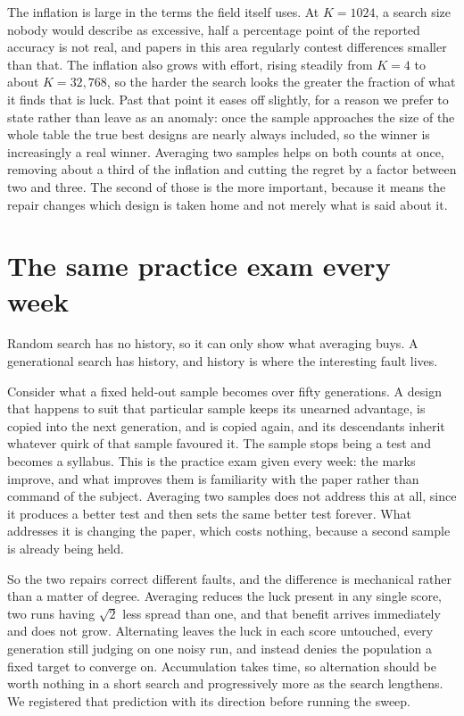 \documentclass[11pt]{article}
\begin{document}
The inflation is large in the terms the field itself uses. At $K = 1024$, a search size nobody would
describe as excessive, half a percentage point of the reported accuracy is not real, and papers in this
area regularly contest differences smaller than that. The inflation also grows with effort, rising
steadily from $K = 4$ to about $K = 32{,}768$, so the harder the search looks the greater the fraction
of what it finds that is luck. Past that point it eases off slightly, for a reason we prefer to state
rather than leave as an anomaly: once the sample approaches the size of the whole table the true best
designs are nearly always included, so the winner is increasingly a real winner. Averaging two
samples helps on both counts at once, removing about a third of the inflation and cutting the regret by
a factor between two and three. The second of those is the more important, because it means the repair
changes which design is taken home and not merely what is said about it.

\section{The same practice exam every week}\label{sec:repairs}

Random search has no history, so it can only show what averaging buys. A generational search has
history, and history is where the interesting fault lives.

Consider what a fixed held-out sample becomes over fifty generations. A design that happens to suit that
particular sample keeps its unearned advantage, is copied into the next generation, and is copied again,
and its descendants inherit whatever quirk of that sample favoured it. The sample stops being a test and
becomes a syllabus. This is the practice exam given every week: the marks improve, and what improves them
is familiarity with the paper rather than command of the subject. Averaging two samples does not address
this at all, since it produces a better test and then sets the same better test forever. What addresses it
is changing the paper, which costs nothing, because a second sample is already being held.

So the two repairs correct different faults, and the difference is mechanical rather than a matter of
degree. Averaging reduces the luck present in any single score, two runs having $\sqrt 2$ less spread than
one, and that benefit arrives immediately and does not grow. Alternating leaves the luck in each score
untouched, every generation still judging on one noisy run, and instead denies the population a fixed
target to converge on. Accumulation takes time, so alternation should be worth nothing in a short search
and progressively more as the search lengthens. We registered that prediction with its direction before
running the sweep.
\end{document}
